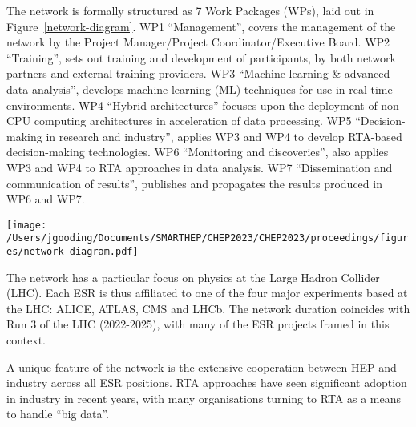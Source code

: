 The network is formally structured as 7 Work Packages (WPs), laid out in Figure~\ref{network-diagram}. WP1 ``Management'', covers the management of the network by the Project Manager/Project Coordinator/Executive Board. WP2 ``Training'', sets out training and development of participants, by both network partners and external training providers. WP3 ``Machine learning \& advanced data analysis'', develops machine learning (ML) techniques for use in real-time environments. WP4 ``Hybrid architectures'' focuses upon the deployment of non-CPU computing architectures in acceleration of data processing. WP5 ``Decision-making in research and industry'', applies WP3 and WP4 to develop RTA-based decision-making technologies. WP6 ``Monitoring and discoveries'', also applies WP3 and WP4 to RTA approaches in data analysis. WP7 ``Dissemination and communication of results'', publishes and propagates the results produced in WP6 and WP7.\par
\begin{figure*}[h!]
    \centering
    \texttt{[image: /Users/jgooding/Documents/SMARTHEP/CHEP2023/CHEP2023/proceedings/figures/network-diagram.pdf]}
    \caption{The structure of work packages within the SMARTHEP network. WP1 and WP2 define the organisation of the network; WP3 and WP4 introduce the techniques and tools of real-time analysis to the network; WP5 and WP6 use said techniques and tools to produce results for HEP and industry; WP7 makes these results available and promotes their wider use and adoption.}
    \label{network-diagram}       %
\end{figure*}
The network has a particular focus on physics at the Large Hadron Collider (LHC). Each ESR is thus affiliated to one of the four major experiments based at the LHC: ALICE, ATLAS, CMS and LHCb. The network duration coincides with Run 3 of the LHC (2022-2025), with many of the ESR projects framed in this context.\par
A unique feature of the network is the extensive cooperation between HEP and industry across all ESR positions.  RTA approaches have seen significant adoption in industry in recent years, with many organisations turning to RTA as a means to handle ``big data''.\par
